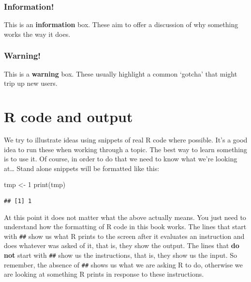 \documentclass[
]{book}
\newenvironment{Shaded}{\begin{snugshade}}{\end{snugshade}}
\newcommand{\DecValTok}[1]{\textcolor[rgb]{0.00,0.00,0.81}{#1}}
\newcommand{\FunctionTok}[1]{\textcolor[rgb]{0.00,0.00,0.00}{#1}}
\newcommand{\NormalTok}[1]{#1}
\newcommand{\OtherTok}[1]{\textcolor[rgb]{0.56,0.35,0.01}{#1}}
\newenvironment{greybox}{
  \definecolor{shadecolor}{rgb}{0.95,0.95,0.95}  %
  \color{black}
  \begin{shaded}}
 {\end{shaded}}
\newenvironment{infobox}[1]
  {
  \begin{itemize}
  \renewcommand{\labelitemi}{
    \raisebox{-.7\height}[0pt][0pt]{
      {\setkeys{Gin}{width=3em,keepaspectratio}
        \texttt{[image: images/\#1]}}
    }
  }
  \setlength{\fboxsep}{1em}
  \begin{greybox}
  \item
  }
  {
  \end{greybox}
  \end{itemize}
  }
\begin{document}
\begin{infobox}{information}

\hypertarget{information}{%
\subsubsection*{Information!}\label{information}}

This is an \textbf{information} box. These aim to offer a discussion of why something works the way it does.

\end{infobox}

\begin{infobox}{warning}

\hypertarget{warning}{%
\subsubsection*{Warning!}\label{warning}}

This is a \textbf{warning} box. These usually highlight a common `gotcha' that might trip up new users.

\end{infobox}

\hypertarget{r-code-and-output}{%
\section*{R code and output}\label{r-code-and-output}}

We try to illustrate ideas using snippets of real R code where possible. It's a good idea to run these when working through a topic. The best way to learn something is to use it. Of course, in order to do that we need to know what we're looking at\ldots{} Stand alone snippets will be formatted like this:

\begin{Shaded}
\begin{Highlighting}[]
\NormalTok{tmp }\OtherTok{\textless{}{-}} \DecValTok{1}
\FunctionTok{print}\NormalTok{(tmp)}
\end{Highlighting}
\end{Shaded}

\begin{verbatim}
## [1] 1
\end{verbatim}

At this point it does not matter what the above actually means. You just need to understand how the formatting of R code in this book works. The lines that start with \texttt{\#\#} show us what R prints to the screen after it evaluates an instruction and does whatever was asked of it, that is, they show the output. The lines that \textbf{do not} start with \texttt{\#\#} show us the instructions, that is, they show us the input. So remember, the absence of \texttt{\#\#} shows us what we are asking R to do, otherwise we are looking at something R prints in response to these instructions.
\end{document}
